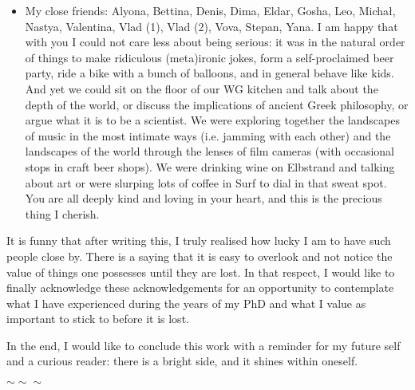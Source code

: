 \begin{itemize}
	\item My close friends: Alyona, Bettina, Denis, Dima, Eldar, Gosha, Leo, Micha\l, Nastya, Valentina, Vlad (1), Vlad (2), Vova, Stepan, Yana. I am happy that with you I could not care less about being serious: it was in the natural order of things to make ridiculous (meta)ironic jokes, form a self-proclaimed beer party, ride a bike with a bunch of balloons, and in general behave like kids. And yet we could sit on the floor of our WG kitchen and talk about the depth of the world, or discuss the implications of ancient Greek philosophy, or argue what it is to be a scientist. We were exploring together the landscapes of music in the most intimate ways (i.e. jamming with each other) and the landscapes of the world through the lenses of film cameras (with occasional stops in craft beer shops). We were drinking wine on Elbstrand and talking about art or were slurping lots of coffee in Surf to dial in that sweat spot. You are all deeply kind and loving in your heart, and this is the precious thing I cherish.
\end{itemize}

It is funny that after writing this, I truly realised how lucky I am to have such people close by. There is a saying that it is easy to overlook and not notice the value of things one possesses until they are lost. In that respect, I would like to finally acknowledge these acknowledgements for an opportunity to contemplate what I have experienced during the years of my PhD and what I value as important to stick to before it is lost.

In the end, I would like to conclude this work with a reminder for my future self and a curious reader: there is a bright side, and it shines within oneself.

\thispagestyle{empty}

\vfill
\centering$\sim\sim\sim$

